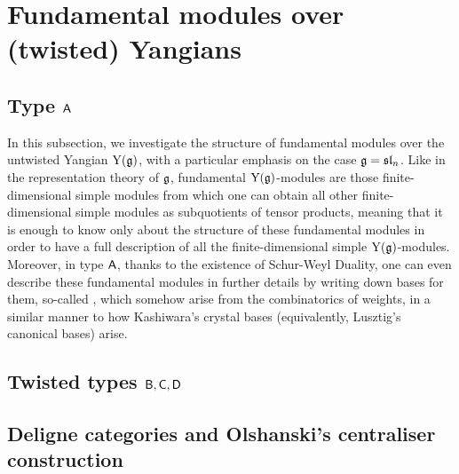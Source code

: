 \section{Fundamental modules over (twisted) Yangians}
    \subsection{Type \texorpdfstring{$\mathsf{A}$}{}}
        In this subsection, we investigate the structure of fundamental modules over the untwisted Yangian $\mathrm{Y}(\mathfrak{g})$, with a particular emphasis on the case $\mathfrak{g} = \mathfrak{sl}_n$. Like in the representation theory of $\mathfrak{g}$, fundamental $\mathrm{Y}(\mathfrak{g})$-modules are those finite-dimensional simple modules from which one can obtain all other finite-dimensional simple modules as subquotients of tensor products, meaning that it is enough to know only about the structure of these fundamental modules in order to have a full description of all the finite-dimensional simple $\mathrm{Y}(\mathfrak{g})$-modules. Moreover, in type $\mathsf{A}$, thanks to the existence of Schur-Weyl Duality, one can even describe these fundamental modules in further details by writing down bases for them, so-called , which somehow arise from the combinatorics of weights, in a similar manner to how Kashiwara's crystal bases (equivalently, Lusztig's canonical bases) arise.

        \begin{definition} \label{def: fundamental_weights_yangians}
            
        \end{definition}

    \subsection{Twisted types \texorpdfstring{$\mathsf{B}, \mathsf{C}, \mathsf{D}$}{}}

    \subsection{Deligne categories and Olshanski's centraliser construction}